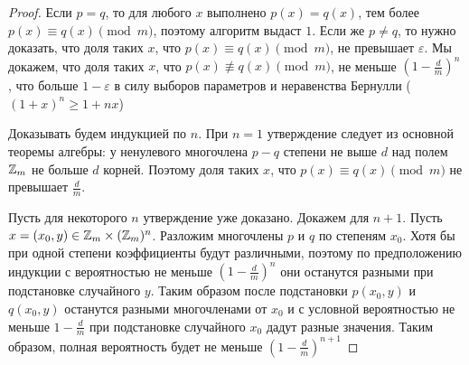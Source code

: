 \begin{proof}
Если $p=q$, то для любого $x$ выполнено $p(x)=q(x)$, тем более $p(x) \equiv q(x) \pmod m$, поэтому алгоритм выдаст $1$. Если же $p \neq q$, то нужно доказать, что доля таких $x$, что $p(x) \equiv q(x) \pmod m$, не превышает $\varepsilon$. Мы докажем, что доля таких $x$, что $p(x) \not\equiv q(x) \pmod m$, не меньше $(1-\frac{d}{m})^n$, что больше $1-\varepsilon$ в силу выборов параметров и неравенства Бернулли ($(1+x)^n \ge 1 + nx$)

Доказывать будем индукцией по $n$. При $n=1$ утверждение следует из основной теоремы алгебры: у ненулевого многочлена $p-q$ степени не выше $d$ над полем $\mathbb{Z}_m$ не больше $d$ корней. Поэтому доля таких $x$, что $p(x) \equiv q(x) \pmod m$ не превышает $\frac{d}{m}$.

Пусть для некоторого $n$ утверждение уже доказано. Докажем для $n+1$. Пусть $x=(x_0,y) \in \mathbb{Z}_m \times (\mathbb{Z}_m)^n$. Разложим многочлены $p$ и $q$ по степеням $x_0$. Хотя бы при одной степени коэффициенты будут различными, поэтому по предположению индукции с вероятностью не меньше $(1-\frac{d}{m})^n$ они останутся разными при подстановке случайного $y$. Таким образом после подстановки $p(x_0,y)$ и $q(x_0,y)$ останутся разными многочленами от $x_0$ и с условной вероятностью не меньше $1-\frac{d}{m}$ при подстановке случайного $x_0$ дадут разные значения. Таким образом, полная вероятность будет не меньше $(1-\frac{d}{m})^{n+1}$ \end{proof}

